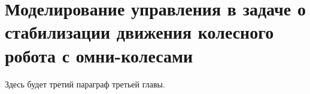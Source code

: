 \section{Моделирование управления в задаче о стабилизации движения колесного робота с омни-колесами} \label{p33}

Здесь будет третий параграф третьей главы.
